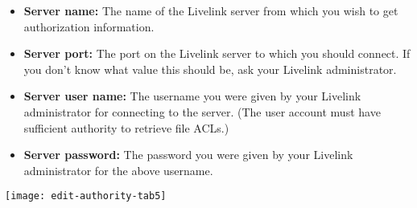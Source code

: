 \begin{itemize}

\item \textbf{Server name:} The name of the Livelink server from which
you wish to get authorization information.

\item \textbf{Server port:} The port on the Livelink server to which you
should connect. If you don't know what value this should be, ask your
Livelink administrator.

\item \textbf{Server user name:} The username you were given by your
Livelink administrator for connecting to the server. (The user account
must have sufficient authority to retrieve file ACLs.)

\item \textbf{Server password:} The password you were given by your
Livelink administrator for the above username.

\end{itemize}

\texttt{[image: edit-authority-tab5]}


